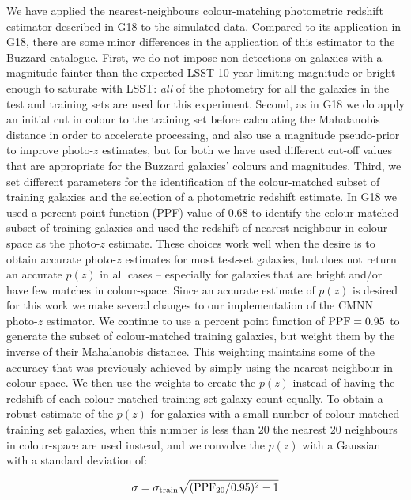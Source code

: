 We have applied the nearest-neighbours colour-matching photometric redshift estimator described in G18 to the simulated data. Compared to its application in G18, there are some minor differences in the application of this estimator to the Buzzard catalogue. First, we do not impose non-detections on galaxies with a magnitude fainter than the expected LSST 10-year limiting magnitude or bright enough to saturate with LSST: {\it all} of the photometry for all the galaxies in the test and training sets are used for this experiment. Second, as in G18 we do apply an initial cut in colour to the training set before calculating the Mahalanobis distance in order to accelerate processing, and also use a magnitude pseudo-prior to improve photo-$z$ estimates, but for both we have used different cut-off values that are appropriate for the Buzzard galaxies' colours and magnitudes. Third, we set different parameters for the identification of the colour-matched subset of training galaxies and the selection of a photometric redshift estimate. In G18 we used a percent point function (PPF) value of 0.68 to identify the colour-matched subset of training galaxies and used the redshift of nearest neighbour in colour-space as the photo-$z$ estimate. These choices work well when the desire is to obtain accurate photo-$z$ estimates for most test-set galaxies, but does not return an accurate $p(z)$ in all cases -- especially for galaxies that are bright and/or have few matches in colour-space. Since an accurate estimate of $p(z)$ is desired for this work we make several changes to our implementation of the \textsc{CMNN} photo-$z$ estimator. We continue to use a percent point function of ${\rm PPF} = 0.95$ to generate the subset of colour-matched training galaxies, but weight them by the inverse of their Mahalanobis distance. This weighting maintains some of the accuracy that was previously achieved by simply using the nearest neighbour in colour-space. We then use the weights to create the $p(z)$ instead of having the redshift of each colour-matched training-set galaxy count equally. To obtain a robust estimate of the $p(z)$ for galaxies with a small number of colour-matched training set galaxies, when this number is less than $20$ the nearest $20$ neighbours in colour-space are used instead, and we convolve the $p(z)$ with a Gaussian with a standard deviation of:

\begin{equation}
\sigma = \sigma_{\rm train} \sqrt{({\rm PPF}_{20}/0.95)^2 -1}
\end{equation}

